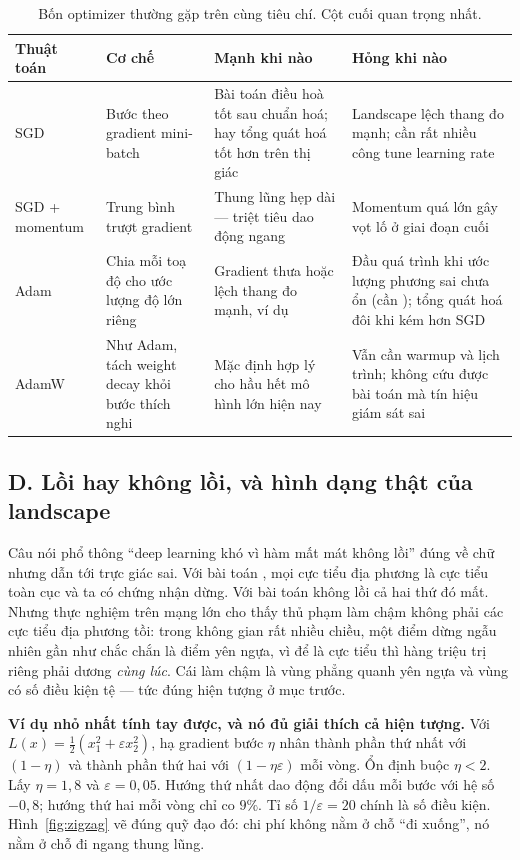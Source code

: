 \documentclass[../../../deep_learning.tex]{subfiles}
\begin{document}
\begin{table}[H]\centering\small
\caption{Bốn optimizer thường gặp trên cùng tiêu chí. Cột cuối quan trọng nhất.}
\label{tab:optimizer}
\begin{tabularx}{\linewidth}{@{}L{2.0cm}L{3.2cm}YL{3.6cm}@{}}
\toprule
\textbf{Thuật toán} & \textbf{Cơ chế} & \textbf{Mạnh khi nào} & \textbf{Hỏng khi nào}\\
\midrule
SGD & Bước theo gradient mini-batch & Bài toán điều hoà tốt sau chuẩn hoá; hay tổng quát hoá tốt hơn trên thị giác & Landscape lệch thang đo mạnh; cần rất nhiều công tune learning rate\\
SGD + momentum & Trung bình trượt gradient & Thung lũng hẹp dài --- triệt tiêu dao động ngang & Momentum quá lớn gây vọt lố ở giai đoạn cuối\\
Adam & Chia mỗi toạ độ cho ước lượng độ lớn riêng & Gradient thưa hoặc lệch thang đo mạnh, ví dụ  & Đầu quá trình khi ước lượng phương sai chưa ổn (cần ); tổng quát hoá đôi khi kém hơn SGD\\
AdamW & Như Adam, tách weight decay khỏi bước thích nghi & Mặc định hợp lý cho hầu hết mô hình lớn hiện nay & Vẫn cần warmup và lịch trình; không cứu được bài toán mà tín hiệu giám sát sai\\
\bottomrule
\end{tabularx}
\end{table}

\subsection{D. Lồi hay không lồi, và hình dạng thật của landscape}
Câu nói phổ thông ``deep learning khó vì hàm mất mát không lồi'' đúng về chữ nhưng dẫn tới trực giác sai. Với bài toán , mọi cực tiểu địa phương là cực tiểu toàn cục và ta có chứng nhận dừng. Với bài toán không lồi cả hai thứ đó mất. Nhưng thực nghiệm trên mạng lớn cho thấy thủ phạm làm chậm không phải các cực tiểu địa phương tồi: trong không gian rất nhiều chiều, một điểm dừng ngẫu nhiên gần như chắc chắn là điểm yên ngựa, vì để là cực tiểu thì hàng triệu trị riêng phải dương \emph{cùng lúc}. Cái làm chậm là vùng phẳng quanh yên ngựa và vùng có số điều kiện tệ --- tức đúng hiện tượng ở mục trước.

\textbf{Ví dụ nhỏ nhất tính tay được, và nó đủ giải thích cả hiện tượng.} Với \(L(x)=\tfrac12(x_1^2+\varepsilon x_2^2)\), hạ gradient bước \(\eta\) nhân thành phần thứ nhất với \((1-\eta)\) và thành phần thứ hai với \((1-\eta\varepsilon)\) mỗi vòng. Ổn định buộc \(\eta<2\). Lấy \(\eta = 1{,}8\) và \(\varepsilon = 0{,}05\). Hướng thứ nhất dao động đổi dấu mỗi bước với hệ số \(-0{,}8\); hướng thứ hai mỗi vòng chỉ co \(9\%\). Tỉ số \(1/\varepsilon = 20\) chính là số điều kiện. Hình~\ref{fig:zigzag} vẽ đúng quỹ đạo đó: chi phí không nằm ở chỗ ``đi xuống'', nó nằm ở chỗ đi ngang thung lũng.
\end{document}
